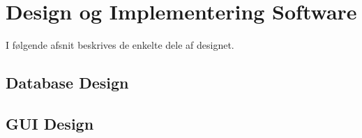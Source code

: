 \section{Design og Implementering Software}
I følgende afsnit beskrives de enkelte dele af designet.

\subsection{Database Design}


\subsection{GUI Design}
